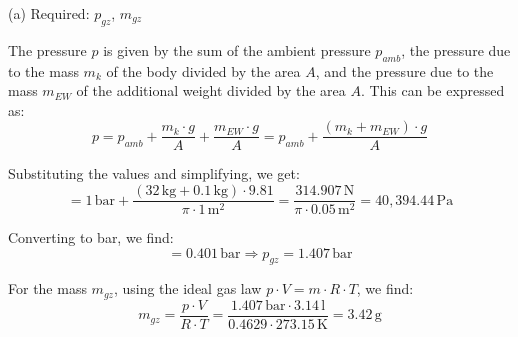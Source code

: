 (a) Required: \( p_{gz} \), \( m_{gz} \)

The pressure \( p \) is given by the sum of the ambient pressure \( p_{amb} \), the pressure due to the mass \( m_k \) of the body divided by the area \( A \), and the pressure due to the mass \( m_{EW} \) of the additional weight divided by the area \( A \). This can be expressed as:
\[ 
p = p_{amb} + \frac{m_k \cdot g}{A} + \frac{m_{EW} \cdot g}{A} = p_{amb} + \frac{(m_k + m_{EW}) \cdot g}{A}
\]

Substituting the values and simplifying, we get:
\[ 
= 1 \, \text{bar} + \frac{(32 \, \text{kg} + 0.1 \, \text{kg}) \cdot 9.81}{\pi \cdot 1 \, \text{m}^2} = \frac{314.907 \, \text{N}}{\pi \cdot 0.05 \, \text{m}^2} = 40,394.44 \, \text{Pa}
\]

Converting to bar, we find:
\[ 
= 0.401 \, \text{bar} \Rightarrow p_{gz} = 1.407 \, \text{bar}
\]

For the mass \( m_{gz} \), using the ideal gas law \( p \cdot V = m \cdot R \cdot T \), we find:
\[ 
m_{gz} = \frac{p \cdot V}{R \cdot T} = \frac{1.407 \, \text{bar} \cdot 3.14 \, \text{l}}{0.4629 \cdot 273.15 \, \text{K}} = 3.42 \, \text{g}
\]